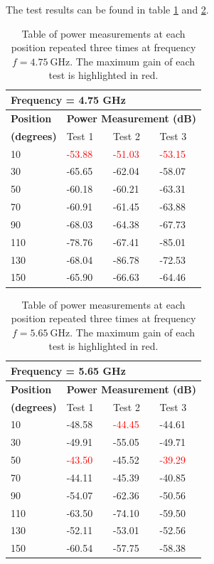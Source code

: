 The test results can be found in table \ref{tab:a2_5a} and \ref{tab:a2_5b}.
\begin{table}[H]
    \centering
    \begin{tabular}{l|l|l|l}
        \multicolumn{4}{l}{\textbf{Frequency = 4.75 GHz}}         \\
        \hline
        \textbf{Position} & \multicolumn{3}{l}{\textbf{Power Measurement (dB)}} \\
        \textbf{(degrees)}  & Test 1    & Test 2  & Test 3  \\
        \hline
        \hline
        10      & \textcolor{red}{-53.88}    & \textcolor{red}{-51.03}    & \textcolor{red}{-53.15} \\
        30      & -65.65    & -62.04    & -58.07 \\
        50      & -60.18    & -60.21    & -63.31 \\
        70      & -60.91    & -61.45    & -63.88 \\
        90      & -68.03    & -64.38    & -67.73 \\
        110     & -78.76    & -67.41    & -85.01 \\
        130     & -68.04    & -86.78    & -72.53 \\
        150     & -65.90    & -66.63    & -64.46
        \end{tabular}
    \caption{Table of power measurements at each position repeated three times at frequency $f=\SI{4.75}{\giga\hertz}$. The maximum gain of each test is highlighted in red.}
    \label{tab:a2_5a}
\end{table}

\begin{table}[H]
    \centering
    \begin{tabular}{l|l|l|l}
        \multicolumn{4}{l}{\textbf{Frequency = 5.65 GHz}}         \\
        \hline
        \textbf{Position} & \multicolumn{3}{l}{\textbf{Power Measurement (dB)}} \\
        \textbf{(degrees)}  & Test 1    & Test 2  & Test 3  \\
        \hline
        \hline
        10      & -48.58    & \textcolor{red}{-44.45}    & -44.61 \\
        30      & -49.91    & -55.05    & -49.71 \\
        50      & \textcolor{red}{-43.50}    & -45.52    & \textcolor{red}{-39.29} \\
        70      & -44.11    & -45.39    & -40.85 \\
        90      & -54.07    & -62.36    & -50.56 \\
        110     & -63.50    & -74.10    & -59.50 \\
        130     & -52.11    & -53.01    & -52.56 \\
        150     & -60.54    & -57.75    & -58.38
        \end{tabular}
    \caption{Table of power measurements at each position repeated three times at frequency $f=\SI{5.65}{\giga\hertz}$. The maximum gain of each test is highlighted in red.}
    \label{tab:a2_5b}
\end{table}

